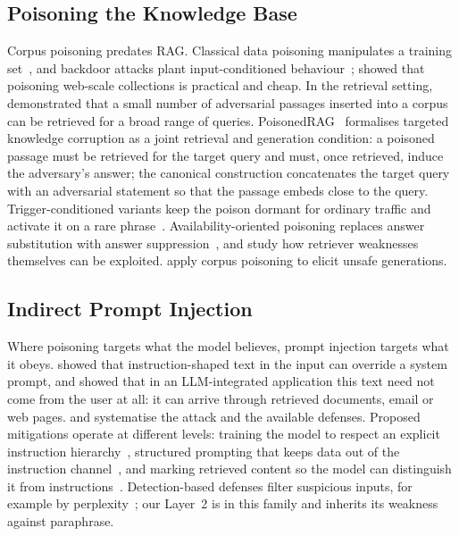 \subsection{Poisoning the Knowledge Base}

Corpus poisoning predates RAG. Classical data poisoning manipulates a training
set~\citep{biggio2012poisoning}, and backdoor attacks plant input-conditioned
behaviour~\citep{gu2017badnets}; \citet{carlini2024poison} showed that poisoning web-scale
collections is practical and cheap. In the retrieval setting, \citet{zhong2023} demonstrated
that a small number of adversarial passages inserted into a corpus can be retrieved for a broad
range of queries. PoisonedRAG~\citep{zou2024} formalises targeted knowledge corruption as a
joint retrieval and generation condition: a poisoned passage must be retrieved for the target
query and must, once retrieved, induce the adversary's answer; the canonical construction
concatenates the target query with an adversarial statement so that the passage embeds close to
the query. Trigger-conditioned variants keep the poison dormant for ordinary traffic and
activate it on a rare phrase~\citep{xue2024badrag,cheng2024trojanrag,chaudhari2024phantom}.
Availability-oriented poisoning replaces answer substitution with answer
suppression~\citep{shafran2024jamming}, and \citet{tan2024glue} study how retriever weaknesses
themselves can be exploited. \citet{deng2024pandora} apply corpus poisoning to elicit unsafe
generations.

\subsection{Indirect Prompt Injection}

Where poisoning targets what the model believes, prompt injection targets what it obeys.
\citet{perez2022ignore} showed that instruction-shaped text in the input can override a system
prompt, and \citet{greshake2023} showed that in an LLM-integrated application this text need
not come from the user at all: it can arrive through retrieved documents, email or web pages.
\citet{liu2023promptinjection} and \citet{liu2024formalizing} systematise the attack and the
available defenses. Proposed mitigations operate at different levels: training the model to
respect an explicit instruction hierarchy~\citep{wallace2024hierarchy}, structured prompting
that keeps data out of the instruction channel~\citep{chen2024struq,chen2025secalign}, and
marking retrieved content so the model can distinguish it from
instructions~\citep{hines2024spotlighting}. Detection-based defenses filter suspicious inputs,
for example by perplexity~\citep{alon2023perplexity,jain2023baseline}; our Layer~2 is in this
family and inherits its weakness against paraphrase.

